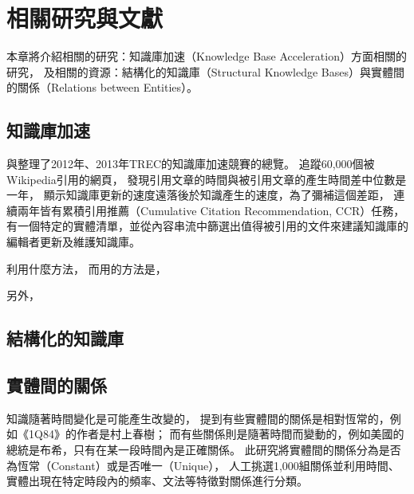 %
%
%
\chapter{相關研究與文獻}
\label{c:related}

本章將介紹相關的研究：知識庫加速（Knowledge Base Acceleration）方面相關的研究，
及相關的資源：結構化的知識庫（Structural Knowledge Bases）與實體間的關係（Relations between Entities）。

%
%
\section{知識庫加速}

\cite{kba2012}與\cite{kba2013}整理了2012年、2013年TREC的知識庫加速競賽的總覽。
\cite{kba2012}追蹤60,000個被Wikipedia引用的網頁，
發現引用文章的時間與被引用文章的產生時間差中位數是一年，
顯示知識庫更新的速度遠落後於知識產生的速度，為了彌補這個差距，
連續兩年皆有累積引用推薦（Cumulative Citation Recommendation, CCR）任務，   %
有一個特定的實體清單，並從內容串流中篩選出值得被引用的文件來建議知識庫的編輯者更新及維護知識庫。



\cite{kba-hltoce}利用什麼方法，
而\cite{kba-msra}用的方法是，

另外，\cite{kba-entity-detection}

%
%
\section{結構化的知識庫}

\cite{freebase}
\cite{dbpedia}
\cite{yago}

\cite{freebase-qa-extract}
\cite{freebase-qa-parse}
\cite{yago-qa}

\cite{aptagger}
%
%
\section{實體間的關係}

知識隨著時間變化是可能產生改變的，
\cite{relationsByTime} 提到有些實體間的關係是相對恆常的，例如《1Q84》的作者是村上春樹；
而有些關係則是隨著時間而變動的，例如美國的總統是布希，只有在某一段時間內是正確關係。
此研究將實體間的關係分為是否為恆常（Constant）或是否唯一（Unique），
人工挑選1,000組關係並利用時間、實體出現在特定時段內的頻率、文法等特徵對關係進行分類。


